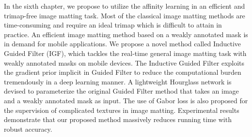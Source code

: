 \begin{enabstract}
  In the sixth chapter, we propose to utilize the affinity learning in an efficient and trimap-free image matting task. Most of the classical image matting methods are time-consuming and require an ideal trimap which is difficult to attain in practice. An efficient image matting method based on a weakly annotated mask is in demand for mobile applications. We propose a novel method called Inductive Guided Filter (IGF), which tackles the real-time general image matting task with weakly annotated masks on mobile devices. 
  The Inductive Guided Filter exploits the gradient prior implicit in Guided Filter to reduce the computational burden tremendously in a deep learning manner. A lightweight Hourglass network is devised to parameterize the original Guided Filter method that takes an image and a weakly annotated mask as input. 
  The use of Gabor loss is also proposed for the supervision of complicated textures in image matting.
  Experimental results demonstrate that our proposed method massively reduces running time with robust accuracy.

\end{enabstract}
